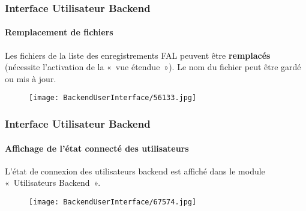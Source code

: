 \begin{frame}[fragile]
	\frametitle{Interface Utilisateur Backend}
	\framesubtitle{Remplacement de fichiers}

	Les fichiers de la liste des enregistrements FAL peuvent être \textbf{remplacés} (nécessite
	l'activation de la «~vue étendue~»).
	Le nom du fichier peut être gardé ou mis à jour.

	\begin{figure}
		\texttt{[image: BackendUserInterface/56133.jpg]}
	\end{figure}

\end{frame}

\begin{frame}[fragile]
	\frametitle{Interface Utilisateur Backend}
	\framesubtitle{Affichage de l'état connecté des utilisateurs}

	L'état de connexion des utilisateurs backend est affiché dans le module «~Utilisateurs Backend~».

	\begin{figure}
		\texttt{[image: BackendUserInterface/67574.jpg]}
	\end{figure}

\end{frame}

